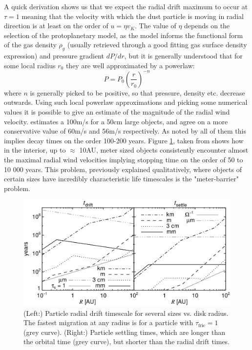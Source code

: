 \documentclass[12pt]{article}
\begin{document}
A quick derivation shows us that we expect the radial drift maximum to occur at $\tau=1$ meaning that the velocity with which the dust particle is moving in radial direction is at least on the order of $u=\eta v_K$. The value of $\eta$ depends on the selection of the protoplanetary model, as the model informs the functional form of the gas density $\rho_g$ (usually retrieved through a good fitting gas surface density expression) and pressure gradient $dP/dr$, but it is generally understood that for some local radius $r_0$ they are well approximated by a powerlaw: 
$$P = P_0 \left(\frac{r}{r_0}\right)^{-n}$$
where $n$ is generally picked to be positive, so that pressure, density etc. decrease outwards. Using such local powerlaw approximations and picking some numerical values it is possible to give an estimate of the magnitude of the radial wind velocity. \citet{Weidenschilling77} estimates a 100m/s for a 50cm large objects, \cite{Armitage07} and \cite{LesHouches} agree on a more conservative value of 60m/s and 56m/s respectively. As noted by all of them this implies decay times on the order 100-200 years. Figure \ref{fig:drifttimes}, taken from \cite{LesHouches} shows how in the interior, up to $\approx$ 10AU, meter sized objects consistently encounter almost the maximal radial wind velocities implying stopping time on the order of 50 to 10 000 years. This problem, previously explained qualitatively, where objects of certain sizes have incredibly characteristic life timescales  is the "meter-barrier" problem.
\begin{figure}[htbp]
    \label{fig:drifttimes}
    \centering
    \includegraphics[width=0.8\linewidth]{drifttimesnotxt.png}
    \caption{(Left:) Particle radial drift timescale for several sizes vs. disk radius. The fastest migration at any radius is for a particle with $\tau_\mathrm{fric} = 1$ (grey curve). (Right:) Particle settling times, which are longer than the orbital time (grey curve), but shorter than the radial drift times.}
\end{figure}
\end{document}
